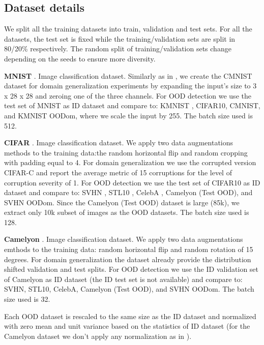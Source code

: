 \subsection{Dataset details}
\label{appendix:dataset}
 We split all the training datasets into train, validation and test sets. For all the datasets, the test set is fixed while the training/validation sets are split in 80/20\% respectively. The random split of training/validation sets change depending on the seeds to ensure more diversity.  
 
\textbf{MNIST} \citep{mnist}. Image classification dataset. Similarly as in \cite{arjovsky2019cmnist}, we create the CMNIST dataset for domain generalization experiments by expanding the input's size to 3 x 28 x 28 and zeroing one of the three channels. For OOD detection we use the test set of MNIST as ID dataset and compare to: KMNIST \citep{kmnist}, CIFAR10, CMNIST, and KMNIST OODom, where we scale the input by 255. The batch size used is 512.

\textbf{CIFAR} \citep{cifar10}. Image classification dataset. We apply two data augmentations methods to the training data:the random horizontal flip and random cropping with padding equal to 4. For domain generalization we use the corrupted version CIFAR-C \citep{benchmarking-corruptions} and report the average metric of 15 corruptions for the level of corruption severity of 1. For OOD detection we use the test set of CIFAR10 as ID dataset and compare to: SVHN \citep{svhn}, STL10 \citep{coates2011stl10}, CelebA \citep{celeba}, Camelyon (Test OOD), and SVHN OODom. Since the Camelyon (Test OOD) dataset is large (85k), we extract only 10k subset of images as the OOD datasets. The batch size used is 128.

\textbf{Camelyon} \citep{wilds}. Image classification dataset. We apply two data augmentations emthods  to the training data: random horizontal flip and random rotation of 15 degrees. For domain generalization the dataset already provide the distribution shifted validation and test splits. For OOD detection we use the ID validation set of Camelyon as ID dataset (the ID  test set is not available) and compare to: SVHN, STL10, CelebA, Camelyon (Test OOD), and SVHN OODom. The batch size used is 32.

Each OOD dataset is rescaled to the same size as the ID dataset and normalized with zero mean and unit variance based on the statistics of ID dataset (for the Camelyon dataset we don't apply any normalization as in \cite{wilds}). 